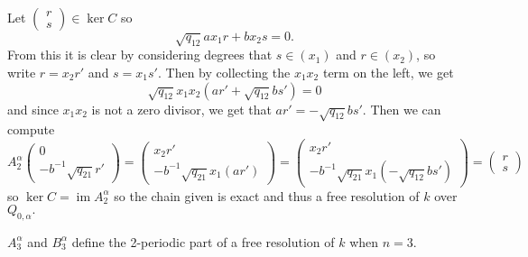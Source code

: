 \documentclass [11pt, proquest] {uwthesis}[2020/02/24]
\begin{document}
\begin{prf}
        Let $(\begin{smallmatrix}
            r\\ s
        \end{smallmatrix})\in\ker C$ so
        \[\sqrt{q_{12}}ax_1r + bx_2s=0.\]
        From this it is clear by considering degrees that $s\in (x_1)$ and $r\in(x_2)$, so write $r=x_2r'$ and $s=x_1s'.$ Then by collecting the $x_1x_2$ term on the left, we get
        \[\sqrt{q_{12}}x_1x_2(ar'+\sqrt{q_{12}}bs')=0\]
        and since $x_1x_2$ is not a zero divisor, we get that $ar'=-\sqrt{q_{12}}bs'.$ Then we can compute
        \[A_2^\alpha\begin{pmatrix}
            0 \\ -b^{-1}\sqrt{q_{21}}r'
        \end{pmatrix}=\begin{pmatrix}
            x_2r' \\ -b^{-1}\sqrt{q_{21}}x_1(ar')
        \end{pmatrix}=\begin{pmatrix}
            x_2r' \\ -b^{-1}\sqrt{q_{21}}x_1(-\sqrt{q_{12}}bs')
        \end{pmatrix}=\begin{pmatrix}
            r \\ s
        \end{pmatrix}\]
        so $\ker C=\operatorname{im} A_2^\alpha$ so the chain given is exact and thus a free resolution of $k$ over $Q_{0,\alpha}.$
    \end{prf}
    \begin{lem}\label{lem:3-dim-k-factorization}
        $A_3^\alpha$ and $B_3^\alpha$ define the 2-periodic part of a free resolution of $k$ when $n=3.$
    \end{lem}
\end{document}
